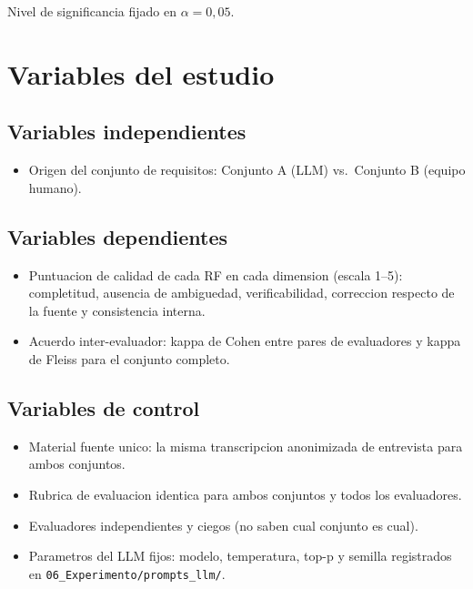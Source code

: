 \documentclass[12pt,a4paper]{article}
\begin{document}
Nivel de significancia fijado en \(\alpha = 0{,}05\).

\section{Variables del estudio}

\subsection{Variables independientes}
\begin{itemize}
    \item Origen del conjunto de requisitos: Conjunto A (LLM) vs.\ Conjunto B
    (equipo humano).
\end{itemize}

\subsection{Variables dependientes}
\begin{itemize}
    \item Puntuacion de calidad de cada RF en cada dimension (escala 1--5):
    completitud, ausencia de ambiguedad, verificabilidad, correccion respecto
    de la fuente y consistencia interna.
    \item Acuerdo inter-evaluador: kappa de Cohen \cite{cohen1960} entre pares
    de evaluadores y kappa de Fleiss \cite{fleiss1971} para el conjunto
    completo.
\end{itemize}

\subsection{Variables de control}
\begin{itemize}
    \item Material fuente unico: la misma transcripcion anonimizada de
    entrevista para ambos conjuntos.
    \item Rubrica de evaluacion identica para ambos conjuntos y todos los
    evaluadores.
    \item Evaluadores independientes y ciegos (no saben cual conjunto es cual).
    \item Parametros del LLM fijos: modelo, temperatura, top-p y semilla
    registrados en \texttt{06\_Experimento/prompts\_llm/}.
\end{itemize}
\end{document}
